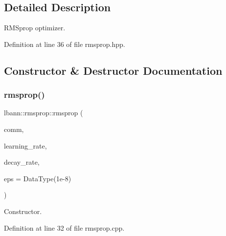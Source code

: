 \subsection{Detailed Description}
R\+M\+Sprop optimizer. 

Definition at line 36 of file rmsprop.\+hpp.



\subsection{Constructor \& Destructor Documentation}
\mbox{\label{classlbann_1_1rmsprop_af42c8e3336e72aac926e19c57b56e59f}} 
\subsubsection{\texorpdfstring{rmsprop()}{rmsprop()}\hspace{0.1cm}{\footnotesize\ttfamily [1/2]}}
{\footnotesize\ttfamily lbann\+::rmsprop\+::rmsprop (\begin{DoxyParamCaption}\item[{\hyperlink{classlbann_1_1lbann__comm}{lbann\+\_\+comm} $\ast$}]{comm,  }\item[{Data\+Type}]{learning\+\_\+rate,  }\item[{Data\+Type}]{decay\+\_\+rate,  }\item[{Data\+Type}]{eps = {\ttfamily DataType(1e-\/8)} }\end{DoxyParamCaption})}

Constructor. 

Definition at line 32 of file rmsprop.\+cpp.


